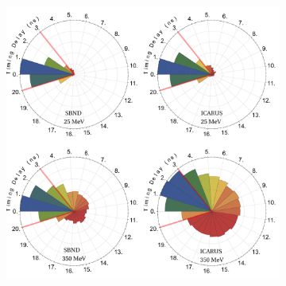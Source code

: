 \documentclass[11pt, a4paper]{article}
\begin{document}
\begin{figure}[t] \center \begin{subfigure}[c]{0.68\textwidth}
\includegraphics[width=\textwidth]{figures/timing.pdf} \end{subfigure}%
\begin{subfigure}[c]{0.32\textwidth}

\end{subfigure}
\end{figure}
\end{document}
